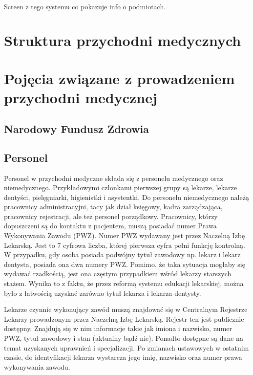 Screen z tego systemu co pokazuje info o podmiotach.

\section[Struktura przychodni medycznych][Struktura przychodni medycznych]{Struktura przychodni medycznych}


\section[Tytuł w paginie][Tytuł w spisie treści]{Pojęcia związane z prowadzeniem przychodni medycznej}
\subsection{Narodowy Fundusz Zdrowia}
\subsection{Personel}
\label{subsec:personel}
Personel w przychodni medyczne składa się z personelu medycznego oraz niemedycznego. Przykładowymi członkami pierwszej grupy są lekarze, lekarze dentyści, pielęgniarki, higienistki i asystentki. Do personelu niemedycznego należą pracownicy administracyjni, tacy jak dział księgowy, kadra zarządzająca, pracownicy rejestracji, ale też personel porządkowy. 
Pracownicy, którzy dopuszczeni są do kontaktu z pacjentem, muszą posiadać numer Prawa Wykonywania Zawodu (PWZ). Numer PWZ wydawany jest przez Naczelną Izbę Lekarską. Jest to 7 cyfrowa liczba, której pierwsza cyfra pełni funkcję kontrolną. W przypadku, gdy osoba posiada podwójny tytuł zawodowy np. lekarz i lekarz dentysta, posiada ona dwa numery PWZ. Pomimo, że taka sytuacja mogłaby się wydawać rzadkością, jest ona częstym przypadkiem wśród lekarzy starszych stażem. Wynika to z faktu, że przez reformą systemu edukacji lekarskiej, można było z łatwością uzyskać zarówno tytuł lekarza i lekarza dentysty.

Lekarze czynnie wykonujący zawód muszą znajdować się w Centralnym Rejestrze Lekarzy prowadzonym przez Naczelną Izbę Lekarską. Rejestr ten jest publicznie dostępny. Znajdują się w nim informacje takie jak imiona i nazwisko, numer PWZ, tytuł zawodowy i stan (aktualny bądź nie). Ponadto dostępne są dane na temat uzyskanych uprawnień i specjalizacji.
Po zmianach ustawowych w ostatnim czasie, do identyfikacji lekarza wystarcza jego imię, nazwisko oraz numer prawa wykonywania zawodu.

